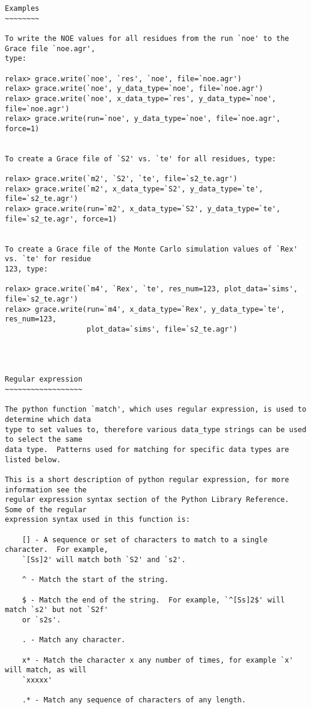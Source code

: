 {\begin{verbatim}
Examples
~~~~~~~~

To write the NOE values for all residues from the run `noe' to the Grace file `noe.agr',
type:

relax> grace.write(`noe', `res', `noe', file=`noe.agr')
relax> grace.write(`noe', y_data_type=`noe', file=`noe.agr')
relax> grace.write(`noe', x_data_type=`res', y_data_type=`noe', file=`noe.agr')
relax> grace.write(run=`noe', y_data_type=`noe', file=`noe.agr', force=1)


To create a Grace file of `S2' vs. `te' for all residues, type:

relax> grace.write(`m2', `S2', `te', file=`s2_te.agr')
relax> grace.write(`m2', x_data_type=`S2', y_data_type=`te', file=`s2_te.agr')
relax> grace.write(run=`m2', x_data_type=`S2', y_data_type=`te', file=`s2_te.agr', force=1)


To create a Grace file of the Monte Carlo simulation values of `Rex' vs. `te' for residue
123, type:

relax> grace.write(`m4', `Rex', `te', res_num=123, plot_data=`sims', file=`s2_te.agr')
relax> grace.write(run=`m4', x_data_type=`Rex', y_data_type=`te', res_num=123,
                   plot_data=`sims', file=`s2_te.agr')




Regular expression
~~~~~~~~~~~~~~~~~~

The python function `match', which uses regular expression, is used to determine which data
type to set values to, therefore various data_type strings can be used to select the same
data type.  Patterns used for matching for specific data types are listed below.

This is a short description of python regular expression, for more information see the
regular expression syntax section of the Python Library Reference.  Some of the regular
expression syntax used in this function is:

    [] - A sequence or set of characters to match to a single character.  For example,
    `[Ss]2' will match both `S2' and `s2'.

    ^ - Match the start of the string.

    $ - Match the end of the string.  For example, `^[Ss]2$' will match `s2' but not `S2f'
    or `s2s'.

    . - Match any character.

    x* - Match the character x any number of times, for example `x' will match, as will
    `xxxxx'

    .* - Match any sequence of characters of any length.


\end{verbatim}}
